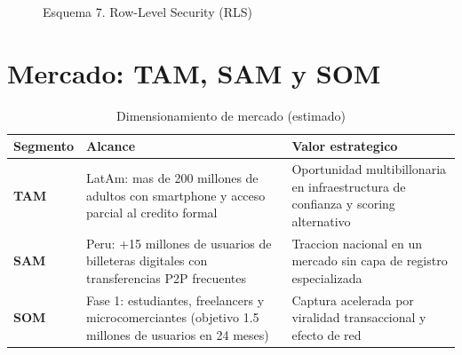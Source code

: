 \documentclass[11pt,a4paper]{article}
\begin{document}
\begin{figure}[htbp]
\centering
{}
\caption{Esquema 7. Row-Level Security (RLS)}
\label{fig:rls-seguridad}
\end{figure}

\section{Mercado: TAM, SAM y SOM}
\begin{table}[htbp]
\centering
\caption{Dimensionamiento de mercado (estimado)}
\begin{tabularx}{\textwidth}{>{\bfseries}p{2.5cm}X X}
\toprule
Segmento & Alcance & Valor estrategico \\
\midrule
TAM & LatAm: mas de 200 millones de adultos con smartphone y acceso parcial al credito formal & Oportunidad multibillonaria en infraestructura de confianza y scoring alternativo \\
SAM & Peru: +15 millones de usuarios de billeteras digitales con transferencias P2P frecuentes & Traccion nacional en un mercado sin capa de registro especializada \\
SOM & Fase 1: estudiantes, freelancers y microcomerciantes (objetivo 1.5 millones de usuarios en 24 meses) & Captura acelerada por viralidad transaccional y efecto de red \\
\bottomrule
\end{tabularx}
\end{table}
\end{document}
